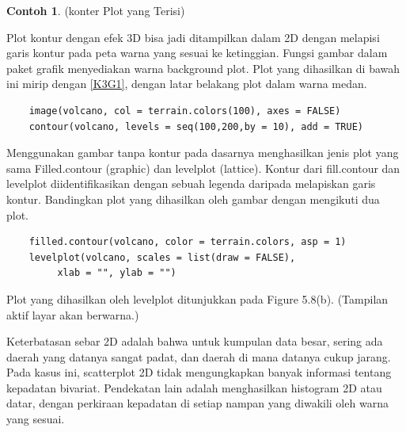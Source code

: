 \documentclass[a4paper,12pt]{article}
\theoremstyle{definition}
\newtheorem{example}{Contoh}[section]
\begin{document}
\begin{example} (konter Plot yang Terisi)

Plot kontur dengan efek 3D bisa jadi ditampilkan dalam 2D dengan melapisi garis kontur pada peta warna yang sesuai ke ketinggian. Fungsi gambar dalam paket grafik menyediakan warna background plot. Plot yang dihasilkan di bawah ini mirip dengan \ref{K3G1}, dengan latar belakang plot dalam warna medan.
\end{example}

\begin{lstlisting}
    image(volcano, col = terrain.colors(100), axes = FALSE)
    contour(volcano, levels = seq(100,200,by = 10), add = TRUE)
\end{lstlisting}

Menggunakan gambar tanpa kontur pada dasarnya menghasilkan jenis plot yang sama Filled.contour (graphic) dan levelplot (lattice). Kontur dari fill.contour dan levelplot diidentifikasikan dengan sebuah legenda daripada melapiskan garis kontur. Bandingkan plot yang dihasilkan oleh gambar dengan mengikuti dua plot.

\begin{lstlisting}
    filled.contour(volcano, color = terrain.colors, asp = 1)
    levelplot(volcano, scales = list(draw = FALSE),
         xlab = "", ylab = "")
\end{lstlisting}

Plot yang dihasilkan oleh levelplot ditunjukkan pada Figure 5.8(b). (Tampilan aktif layar akan berwarna.)

Keterbatasan sebar 2D adalah bahwa untuk kumpulan data besar, sering ada daerah yang datanya sangat padat, dan daerah di mana datanya cukup jarang. Pada kasus ini, scatterplot 2D tidak mengungkapkan banyak informasi tentang kepadatan bivariat. Pendekatan lain adalah menghasilkan histogram 2D atau datar, dengan perkiraan kepadatan di setiap nampan yang diwakili oleh warna yang sesuai.
\end{document}
